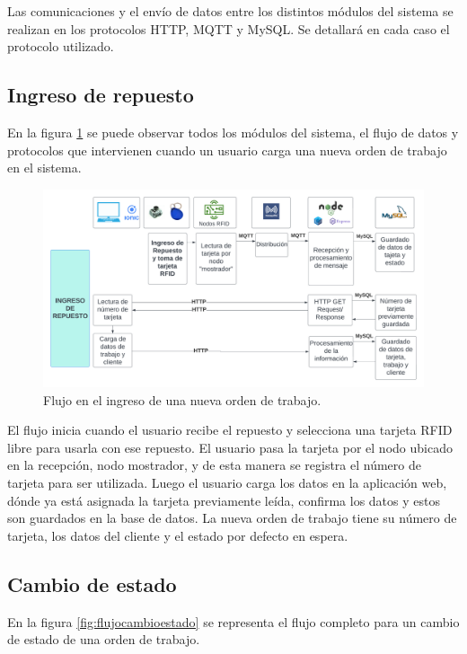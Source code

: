 Las comunicaciones y el envío de datos entre los distintos módulos del sistema se realizan en los protocolos HTTP, MQTT y MySQL. Se detallará en cada caso el protocolo utilizado.

\subsection{Ingreso de repuesto}
\label{subsec:ingresorepuesto}
En la figura \ref{fig:flujoingreso} se puede observar todos los módulos del sistema, el flujo de datos y protocolos que intervienen cuando un usuario carga una nueva orden de trabajo en el sistema.

\begin{figure}[ht]
	\centering
	\includegraphics[width=\textwidth]{./Figures/flujoingreso.png}
	\caption{Flujo en el ingreso de una nueva orden de trabajo.}
	\label{fig:flujoingreso}
\end{figure}
  
El flujo inicia cuando el usuario recibe el repuesto y selecciona una tarjeta RFID libre para usarla con ese repuesto. El usuario pasa la tarjeta por el nodo ubicado en la recepción, nodo mostrador, y de esta manera se registra el número de tarjeta para ser utilizada. Luego el usuario carga los datos en la aplicación web, dónde ya está asignada la tarjeta previamente leída, confirma los datos y estos son guardados en la base de datos. La nueva orden de trabajo tiene su número de tarjeta, los datos del cliente y el estado por defecto en espera.

\subsection{Cambio de estado}
\label{subsec:flujocambioestado}

En la figura \ref{fig:flujocambioestado} se representa el flujo completo para un cambio de estado de una orden de trabajo.


